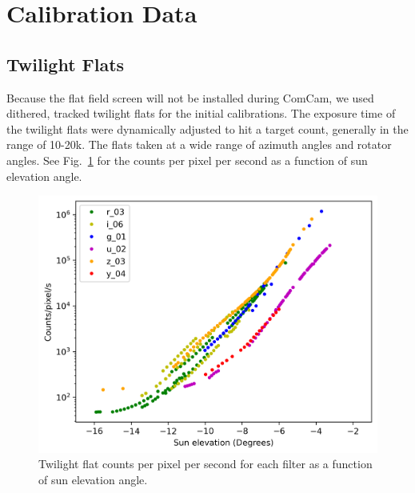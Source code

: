 \section{Calibration Data}
\label{sec:calibration_date}

\subsection{Twilight Flats}

Because the flat field screen will not be installed during ComCam, we used dithered, tracked twilight flats for the initial calibrations. The exposure time of the twilight flats were dynamically adjusted to hit a target count, generally in the range of 10-20k. The flats taken at a wide range of azimuth angles and rotator angles. See Fig.~\ref{fig:twilight_counts} for the counts per pixel per second as a function of sun elevation angle.

\begin{figure}
  \label{fig:twilight_counts}
  \includegraphics{calibration_data_figures/twilight_flat_counts.png}
  \caption{Twilight flat counts per pixel per second for each filter as a function of sun elevation angle.}
\end{figure}
  